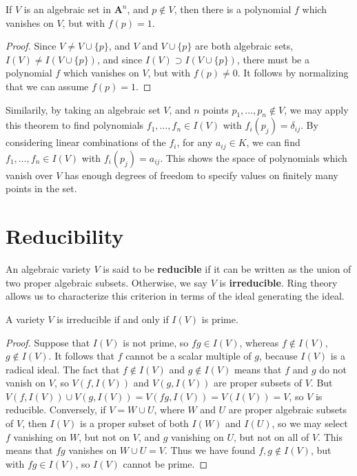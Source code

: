 \begin{corollary}
    If $V$ is an algebraic set in $\mathbf{A}^n$, and $p \not \in V$, then there is a polynomial $f$ which vanishes on $V$, but with $f(p) = 1$.
\end{corollary}
\begin{proof}
    Since $V \neq V \cup \{ p \}$, and $V$ and $V \cup \{ p \}$ are both algebraic sets, $I(V) \neq I(V \cup \{ p \})$, and since $I(V) \supset I(V \cup \{ p \})$, there must be a polynomial $f$ which vanishes on $V$, but with $f(p) \neq 0$. It follows by normalizing that we can assume $f(p) = 1$.
\end{proof}

Similarily, by taking an algebraic set $V$, and $n$ points $p_1, \dots, p_n \not \in V$, we may apply this theorem to find polynomials $f_1, \dots, f_n \in I(V)$ with $f_i(p_j) = \delta_{ij}$. By considering linear combinations of the $f_i$, for any $a_{ij} \in K$, we can find $f_1, \dots, f_n \in I(V)$ with $f_i(p_j) = a_{ij}$. This shows the space of polynomials which vanish over $V$ has enough degrees of freedom to specify values on finitely many points in the set.

\section{Reducibility}

An algebraic variety $V$ is said to be {\bf reducible} if it can be written as the union of two proper algebraic subsets. Otherwise, we say $V$ is {\bf irreducible}. Ring theory allows us to characterize this criterion in terms of the ideal generating the ideal.

\begin{prop}
    A variety $V$ is irreducible if and only if $I(V)$ is prime.
\end{prop}
\begin{proof}
    Suppose that $I(V)$ is not prime, so $fg \in I(V)$, whereas $f \not \in I(V)$, $g \not \in I(V)$. It follows that $f$ cannot be a scalar multiple of $g$, because $I(V)$ is a radical ideal. The fact that $f \not \in I(V)$ and $g \not \in I(V)$ means that $f$ and $g$ do not vanish on $V$, so $V(f, I(V))$ and $V(g, I(V))$ are proper subsets of $V$. But $V(f, I(V)) \cup V(g, I(V)) = V(fg, I(V)) = V(I(V)) = V$, so $V$ is reducible. Conversely, if $V = W \cup U$, where $W$ and $U$ are proper algebraic subsets of $V$, then $I(V)$ is a proper subset of both $I(W)$ and $I(U)$, so we may select $f$ vanishing on $W$, but not on $V$, and $g$ vanishing on $U$, but not on all of $V$. This means that $fg$ vanishes on $W \cup U = V$. Thus we have found $f,g \not \in I(V)$, but with $fg \in I(V)$, so $I(V)$ cannot be prime.
\end{proof}

